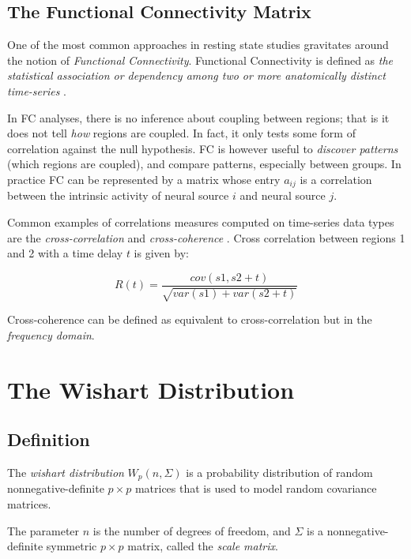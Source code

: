 \documentclass[12pt,openright,twoside,a4paper]{book}
\begin{document}
\section{The Functional Connectivity Matrix}

One of the most common approaches in resting state studies gravitates around the notion of \textit{Functional Connectivity}.
Functional Connectivity is defined as \textit{the statistical association or dependency among two or more anatomically distinct time-series} \cite{connect}.

In FC analyses, there is no inference about coupling between regions; that is it does not tell \textit{how} regions are coupled.
In fact, it only tests some form of correlation against the null hypothesis.
FC is however useful to \textit{discover patterns} (which regions are coupled), and compare patterns, especially between groups.
In practice FC can be represented by a matrix whose entry $a_{ij}$ is a correlation between the intrinsic activity of neural source $i$ and neural source $j$.

Common examples of correlations measures computed on time-series data types are the \textit{cross-correlation} and \textit{cross-coherence} \cite{connect}.
Cross correlation between regions 1 and 2 with a time delay $t$ is given by:

\begin{equation}
R(t)= \frac{cov(s1,s2+t)}{\sqrt{var(s1)+var(s2+t)}}
\end{equation}

Cross-coherence can be defined as equivalent to cross-correlation but in the \textit{frequency domain}.

\chapter{The Wishart Distribution}

\section{Definition}

The \textit{wishart distribution} $ W_p(n, \Sigma)$ is a probability distribution of random nonnegative-definite $p\times p$ matrices that is used to model random covariance matrices.

The parameter $n$ is the number of degrees of freedom, and $\Sigma$ is a nonnegative-definite symmetric $p\times p$ matrix, called the \textit{scale matrix}.
\end{document}
